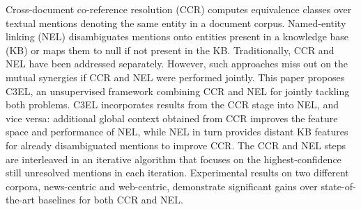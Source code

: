 Cross-document co-reference resolution (CCR) computes equivalence classes over textual mentions denoting the same entity in a document corpus. Named-entity linking (NEL) disambiguates mentions onto entities present in a knowledge base (KB) or maps them to null if not present in the KB. Traditionally, CCR and NEL have been addressed separately. However, such approaches miss out on the mutual synergies if CCR and NEL were performed jointly. This paper proposes C3EL, an unsupervised framework combining CCR and NEL for jointly tackling both problems. C3EL incorporates results from the CCR stage into NEL, and vice versa: additional global context obtained from CCR improves the feature space and performance of NEL, while NEL in turn provides distant KB features for already disambiguated mentions to improve CCR. The CCR and NEL steps are interleaved in an iterative algorithm that focuses on the highest-confidence still unresolved mentions in each iteration. Experimental results on two different corpora, news-centric and web-centric, demonstrate significant gains over state-of-the-art baselines for both CCR and NEL.
